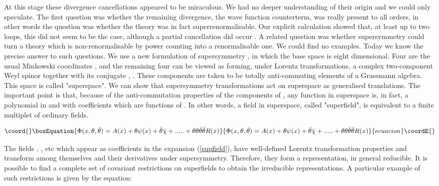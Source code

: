 \documentclass[a4paper,11pt]{article}
\begin{document}
At this stage these divergence cancellations appeared to be miraculous.
We had no deeper understanding of their origin and we could only
speculate. The first question was whether the remaining divergence, the
wave function counterterm, was really present to all orders, in other
words the question was whether the theory was in fact
superrenormalisable. Our explicit calculation showed that, at least
up to two loops, this did not seem to be the case, although a partial
cancellation did occur \cite{IZ}. A related question was whether
supersymmetry could turn a  theory which is non-renormalisable by
power counting into a renormalisable one. We could find no examples.
Today we know the precise answer to such questions. We use a new
formulation of supersymmetry \cite{supspace}, in which
the base space is eight dimensional. Four are the usual Minkowski
coordinates \coordHE{}, \coordHE{} and the remaining four can be
viewed as forming, under Lorentz transformations,  a complex
two-component Weyl spinor
\myHighlight{${\theta}_{\alpha}$}\coordHE{} together with its conjugate \myHighlight{$\bar{\theta}_{\dot{\alpha}}$}\coordHE{},
\coordHE{}. These components are taken to be totally
anti-commuting
elements of a Grassmann algebra. This space is called "superspace".
We can show that supersymmetry transformations act on superspace as
generalised translations.
The important point is that, because of the anti-commutation properties
of the components of \myHighlight{$\theta$}\coordHE{}, any function in superspace is, in fact,
a polynomial in \myHighlight{$\theta$}\coordHE{} and \myHighlight{$\bar{\theta}$}\coordHE{} with coefficients which are
functions of \coordHE{}. In other words, a field in superspace, called
"superfield", is equivalent to a finite multiplet of ordinary fields.

\begin{equation}\coord{}\boxEquation{
\label{supfield}
\Phi (x, \theta , \bar{\theta} ) = A(x)+\theta \psi (x) + \bar{\theta}
\bar{\chi} +.....+\theta \theta \bar{\theta} \bar{\theta} R(x)
}{
\Phi (x, \theta , \bar{\theta} ) = A(x)+\theta \psi (x) + \bar{\theta}
\bar{\chi} +.....+\theta \theta \bar{\theta} \bar{\theta} R(x)
}{ecuacion}\coordE{}\end{equation}

The fields \coordHE{}, \coordHE{}, etc which appear as coefficients in
the expansion (\ref{supfield}), have well-defined Lorentz transformation
properties and transform among themselves and their derivatives under
supersymmetry. Therefore, they form a representation, in general
reducible. It is possible to find a complete set of covariant restrictions
on superfields to obtain the irreducible representations. A particular
example of such restrictions is given by the equation:
\end{document}

